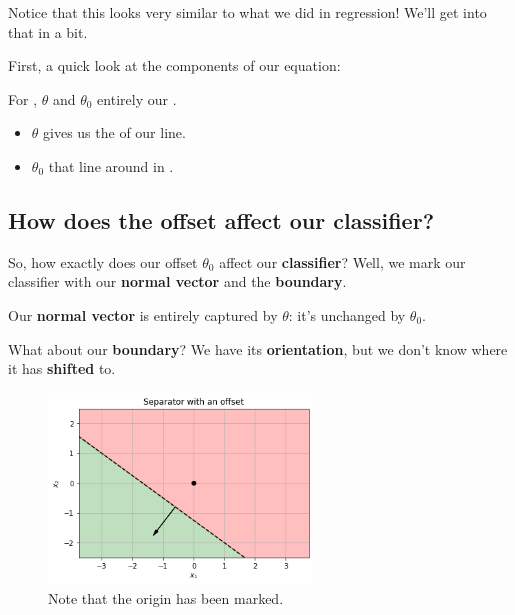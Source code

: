         Notice that this looks very similar to what we did in regression! We'll get into that in a bit.
        
        First, a quick look at the components of our equation:\\
        
        \begin{concept}
            For , $\theta$ and $\theta_0$ entirely  our .
            
            \begin{itemize}
                \item $\theta$ gives us the  of our line.
                \item $\theta_0$  that line around in .
            \end{itemize}
        \end{concept}
    
    \subsection{How does the offset affect our classifier?}
    
        So, how exactly does our offset $\theta_0$ affect our \textbf{classifier}? Well, we mark our classifier with our \textbf{normal vector} and the \textbf{boundary}.
        
        Our \textbf{normal vector} is entirely captured by $\theta$: it's unchanged by $\theta_0$.
        
        What about our \textbf{boundary}? We have its \textbf{orientation}, but we don't know where it has \textbf{shifted} to.
        
        \begin{figure}[H]
            \centering
                \includegraphics[width=70mm,scale=0.5]{images/classification_images/separator_with_offset.png}
                \caption*{Note that the origin has been marked.}
        \end{figure}
        
